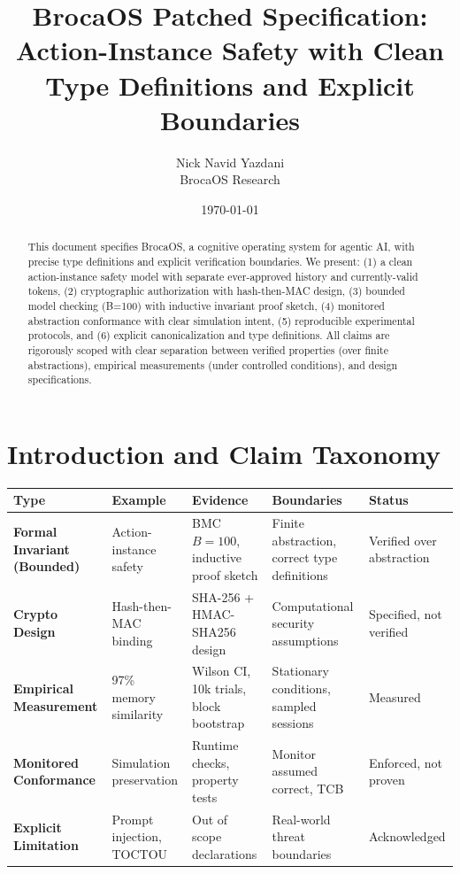 \documentclass[12pt]{article}
\title{BrocaOS Patched Specification: Action-Instance Safety with Clean Type Definitions and Explicit Boundaries}
\author{Nick Navid Yazdani\\BrocaOS Research}
\date{\today}
\begin{document}
\maketitle

\begin{abstract}
This document specifies BrocaOS, a cognitive operating system for agentic AI, with precise type definitions and explicit verification boundaries. We present: (1) a clean action-instance safety model with separate ever-approved history and currently-valid tokens, (2) cryptographic authorization with hash-then-MAC design, (3) bounded model checking (B=100) with inductive invariant proof sketch, (4) monitored abstraction conformance with clear simulation intent, (5) reproducible experimental protocols, and (6) explicit canonicalization and type definitions. All claims are rigorously scoped with clear separation between verified properties (over finite abstractions), empirical measurements (under controlled conditions), and design specifications.
\end{abstract}

\section{Introduction and Claim Taxonomy}

\begin{center}
\small
\begin{tabular}{@{}p{}p{}p{}p{}p{}@{}}
\toprule
\textbf{Type} & \textbf{Example} & \textbf{Evidence} & \textbf{Boundaries} & \textbf{Status} \\
\midrule
\textbf{Formal Invariant (Bounded)} & Action-instance safety & BMC $B=100$, inductive proof sketch & Finite abstraction, correct type definitions & Verified over abstraction \\
\textbf{Crypto Design} & Hash-then-MAC binding & SHA-256 + HMAC-SHA256 design & Computational security assumptions & Specified, not verified \\
\textbf{Empirical Measurement} & 97\% memory similarity & Wilson CI, 10k trials, block bootstrap & Stationary conditions, sampled sessions & Measured \\
\textbf{Monitored Conformance} & Simulation preservation & Runtime checks, property tests & Monitor assumed correct, TCB & Enforced, not proven \\
\textbf{Explicit Limitation} & Prompt injection, TOCTOU & Out of scope declarations & Real-world threat boundaries & Acknowledged \\
\bottomrule
\end{tabular}
\end{center}
\end{document}
